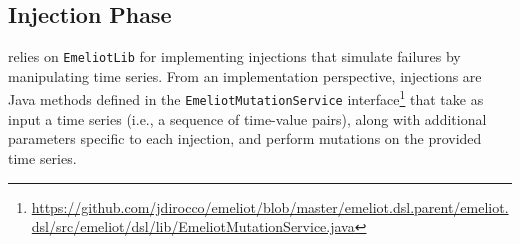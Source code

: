 \subsection{Injection Phase}
\label{sec:injection}

\tool relies on \texttt{EmeliotLib} for implementing injections that simulate failures by manipulating time series. From an implementation perspective, injections are Java methods defined in the \texttt{EmeliotMutationService} interface\footnote{\url{https://github.com/jdirocco/emeliot/blob/master/emeliot.dsl.parent/emeliot.dsl/src/emeliot/dsl/lib/EmeliotMutationService.java}} that take as input a time series (i.e., a sequence of time-value pairs), along with additional parameters specific to each injection, and perform mutations on the provided time series.

